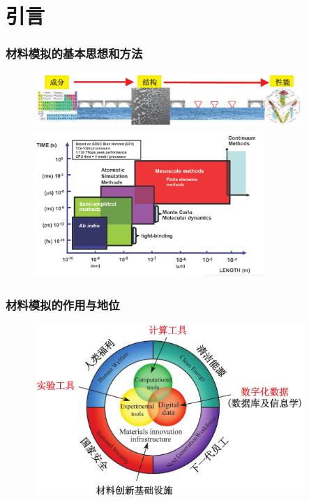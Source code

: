 \documentclass[cjk,slidestop,compress,mathserif,blue]{beamer}
\begin{document}
\section{引言}
\frame
{
	\frametitle{材料模拟的基本思想和方法}
\begin{figure}[h!]
\vspace*{-0.25in}
\centering
\includegraphics[height=0.80in,width=4.05in]{Figures/MGE-2.png}
\vskip 0.05pt
\includegraphics[height=2.20in,width=3.45in]{Figures/Multi-Scale-6.png}
\label{Multi-Scale}
\end{figure}
}

\frame
{
	\frametitle{材料模拟的作用与地位}
\begin{figure}[h!]
\vspace*{-0.18in}
\centering
\includegraphics[height=2.55in,width=4.05in]{Figures/MGE.png}
\label{MGE}
\end{figure}
}
\end{document}
